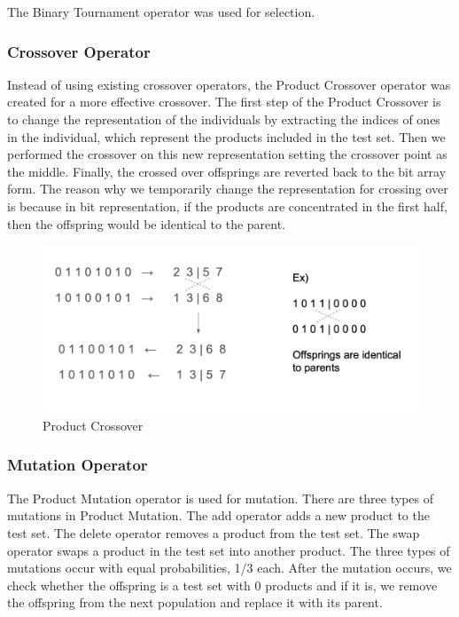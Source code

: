\documentclass[a4paper,12pt]{article}
\begin{document}
The Binary Tournament operator was used for selection. 

\subsubsection{Crossover Operator}

Instead of using existing crossover operators, the Product Crossover operator was created for a more effective crossover. The first step of the Product Crossover is to change the representation of the individuals by extracting the indices of ones in the individual, which represent the products included in the test set. Then we performed the crossover on this new representation setting the crossover point as the middle. Finally, the crossed over offsprings are reverted back to the bit array form. The reason why we temporarily change the representation for crossing over is because in bit representation, if the products are concentrated in the first half, then the offspring would be identical to the parent.

\begin{figure}[h!]
\centering
\includegraphics[width=.7\linewidth]{Images/productCrossover.png}
\caption{Product Crossover}
\end{figure}

\subsubsection{Mutation Operator}

The Product Mutation operator is used for mutation. There are three types of mutations in Product Mutation. The add operator adds a new product to the test set. The delete operator removes a product from the test set. The swap operator swaps a product in the test set into another product. The three types of mutations occur with equal probabilities, 1/3 each. After the mutation occurs, we check whether the offspring is a test set with 0 products and if it is, we remove the offspring from the next population and replace it with its parent.  
\end{document}
